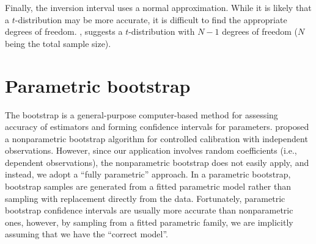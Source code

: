 \documentclass{article}\usepackage[]{graphicx}\usepackage[]{color}
\begin{document}
Finally, the inversion interval uses a normal approximation.  While it is likely that a $t$-distribution may be more accurate, it is difficult to find the appropriate degrees of freedom. \citet{oman-calibration-1998}, suggests a $t$-distribution with $N-1$ degrees of freedom ($N$ being the total sample size).



\section{Parametric bootstrap}\label{sec:boot}

The bootstrap \citep{efron-bootstrap-1979} is a general-purpose computer-based method for assessing accuracy of estimators and forming confidence intervals for parameters.  \citet{jones-bootstrapping-1999} proposed a nonparametric bootstrap algorithm for controlled calibration with independent observations.  However, since our application involves random coefficients (i.e., dependent observations), the nonparametric bootstrap does not easily apply, and instead, we adopt a ``fully parametric'' approach.  In a parametric bootstrap, bootstrap samples are generated from a fitted parametric model rather than sampling with replacement directly from the data.  Fortunately, parametric bootstrap confidence intervals are usually more accurate than nonparametric ones, however, by sampling from a fitted parametric family, we are implicitly assuming that we have the ``correct model''.
\end{document}
